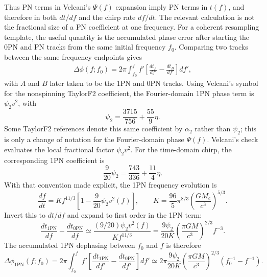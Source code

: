 \documentclass[11pt]{article}
\begin{document}
Thus PN terms in Velcani's $\Psi(f)$ expansion imply PN terms in $t(f)$, and
therefore in both $dt/df$ and the chirp rate $df/dt$. The relevant calculation
is not the fractional size of a PN coefficient at one frequency. For a coherent
resampling template, the useful quantity is the accumulated phase error after
starting the 0PN and PN tracks from the same initial frequency $f_0$. Comparing
two tracks between the same frequency endpoints gives
\begin{gather}
    \Delta\phi(f;f_0)
    =
    2\pi\int_{f_0}^{f}
    f'\left[
      \frac{dt_A}{df'} -
      \frac{dt_B}{df'}
    \right]df' ,
\end{gather}
with $A$ and $B$ later taken to be the 1PN and 0PN tracks.
Using Velcani's symbol for the nonspinning TaylorF2 coefficient, the
Fourier-domain 1PN phase term is $\psi_2v^2$, with
\begin{equation}
    \psi_2 = \frac{3715}{756}+\frac{55}{9}\eta .
    \label{eq:psi_2}
\end{equation}
Some TaylorF2 references denote this same coefficient by $\alpha_2$ rather than
$\psi_2$; this is only a change of notation for the Fourier-domain phase
$\Psi(f)$. Velcani's check evaluates the local fractional factor $\psi_2v^2$.
For the time-domain chirp, the corresponding 1PN coefficient is
\begin{equation}
    \frac{9}{20}\psi_2
    =
    \frac{743}{336}+\frac{11}{4}\eta .
    \label{eq:psi_2_time_domain}
\end{equation}
With that convention made explicit, the 1PN frequency evolution is
\begin{equation}
    \frac{df}{dt}
    =
    K f^{11/3}
    \left[
      1-\frac{9}{20}\psi_2 v^2(f)
    \right],
    \qquad
    K=\frac{96}{5}\pi^{8/3}
    \left(\frac{GM_c}{c^3}\right)^{5/3}.
    \label{eq:dfdt_1pn}
\end{equation}
Invert this to $dt/df$ and expand to first order in the 1PN term:
\begin{equation}
    \frac{dt_{\mathrm{1PN}}}{df}
    -
    \frac{dt_{\mathrm{0PN}}}{df}
    \simeq
    \frac{(9/20)\psi_2 v^2(f)}{K f^{11/3}}
    =
    \frac{9\psi_2}{20K}
    \left(\frac{\pi G M}{c^3}\right)^{2/3}
    f^{-3}.
    \label{eq:dt_df_difference}
\end{equation}
The accumulated 1PN dephasing between $f_0$ and $f$ is therefore
\begin{equation}
    \Delta\phi_{\mathrm{1PN}}(f;f_0)
    =
    2\pi\int_{f_0}^{f}
    f'\left[
      \frac{dt_{\mathrm{1PN}}}{df'} -
      \frac{dt_{\mathrm{0PN}}}{df'}
    \right]df'
    \simeq
    2\pi
    \frac{9\psi_2}{20K}
    \left(\frac{\pi G M}{c^3}\right)^{2/3}
    \left(f_0^{-1}-f^{-1}\right).
    \label{eq:dephasing_1pn}
\end{equation}
\end{document}
